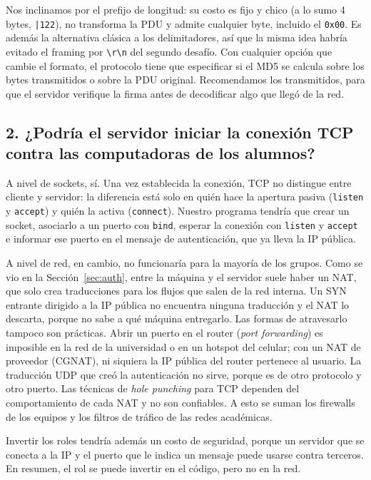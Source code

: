 \documentclass[11pt,a4paper]{article}
\newcommand{\code}[1]{\texttt{#1}}
\newcommand{\crlf}{\texttt{\textbackslash r\textbackslash n}}
\begin{document}
Nos inclinamos por el prefijo de longitud: su costo es fijo y chico (a lo sumo 4 bytes, \code{|122}), no transforma
la PDU y admite cualquier byte, incluido el \code{0x00}. Es además la alternativa clásica a los delimitadores, así
que la misma idea habría evitado el framing por \crlf{} del segundo desafío. Con cualquier opción que cambie el
formato, el protocolo tiene que especificar si el MD5 se calcula sobre los bytes transmitidos o sobre la PDU
original. Recomendamos los transmitidos, para que el servidor verifique la firma antes de decodificar algo que llegó
de la red.

\subsection*{2. ¿Podría el servidor iniciar la conexión TCP contra las computadoras de los alumnos?}

A nivel de sockets, sí. Una vez establecida la conexión, TCP no distingue entre cliente y servidor: la diferencia
está solo en quién hace la apertura pasiva (\code{listen} y \code{accept}) y quién la activa (\code{connect}).
Nuestro programa tendría que crear un socket, asociarlo a un puerto con \code{bind}, esperar la conexión con
\code{listen} y \code{accept} e informar ese puerto en el mensaje de autenticación, que ya lleva la IP pública.

A nivel de red, en cambio, no funcionaría para la mayoría de los grupos. Como se vio en la Sección~\ref{sec:auth},
entre la máquina y el servidor suele haber un NAT, que solo crea traducciones para los flujos que salen de la red
interna. Un SYN entrante dirigido a la IP pública no encuentra ninguna traducción y el NAT lo descarta, porque no
sabe a qué máquina entregarlo. Las formas de atravesarlo tampoco son prácticas. Abrir un puerto en el router
(\textit{port forwarding}) es imposible en la red de la universidad o en un hotspot del celular; con un NAT de
proveedor (CGNAT), ni siquiera la IP pública del router pertenece al usuario. La traducción UDP que creó la
autenticación no sirve, porque es de otro protocolo y otro puerto. Las técnicas de \textit{hole punching} para TCP
dependen del comportamiento de cada NAT y no son confiables. A esto se suman los firewalls de los equipos y los
filtros de tráfico de las redes académicas.

Invertir los roles tendría además un costo de seguridad, porque un servidor que se conecta a la IP y el puerto
que le indica un mensaje puede usarse contra terceros. En resumen, el
rol se puede invertir en el código, pero no en la red.
\end{document}
